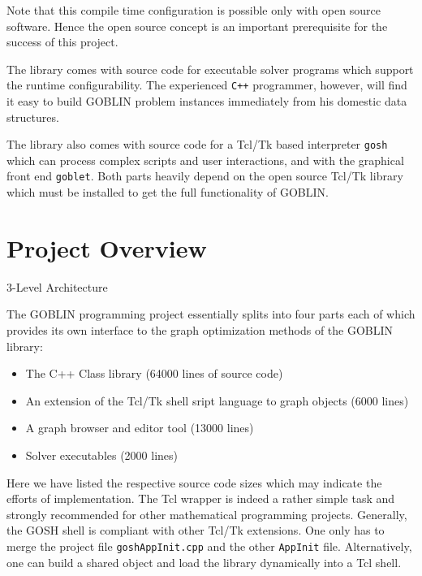 \documentclass[a4paper,11pt,twoside]{book}
\begin{document}
\begin{multicols}{2}
Note that this compile time configuration is possible only with open source
software. Hence the open source concept is an important prerequisite for
the success of this project.

The library comes with source code for executable solver programs which support
the runtime configurability. The experienced \verb/C++/ programmer, however, will
find it easy to build GOBLIN problem instances immediately from his domestic
data structures.

The library also comes with source code for a Tcl/Tk based interpreter
\verb/gosh/ which can process complex scripts and user interactions, and with
the graphical front end \verb/goblet/. Both parts heavily depend on the open
source Tcl/Tk library which must be installed to get the full functionality
of GOBLIN.


\section{Project Overview}

\begin{figurehere}
\begin{center}
\epsfxsize=8cm
\vspace{0.5cm}
\caption{\label{flb_design}$3$-Level Architecture}
\end{center}
\end{figurehere}

\noindent
The GOBLIN programming project essentially splits into four parts each of
which provides its own interface to the graph optimization methods of the
GOBLIN library:
\begin{itemize}
\item The C++ Class library (64000 lines of source code)
\item An extension of the Tcl/Tk shell sript language to graph objects (6000
    lines)
\item A graph browser and editor tool (13000 lines)
\item Solver executables (2000 lines)
\end{itemize}
Here we have listed the respective source code sizes which may indicate the
efforts of implementation. The Tcl wrapper is indeed a rather simple
task and strongly recommended for other mathematical programming projects.
Generally, the GOSH shell is compliant with other Tcl/Tk extensions. One only
has to merge the project file \verb/goshAppInit.cpp/ and the other
\verb/AppInit/ file. Alternatively, one can build a shared object and load the
library dynamically into a Tcl shell.


\end{multicols}
\end{document}

